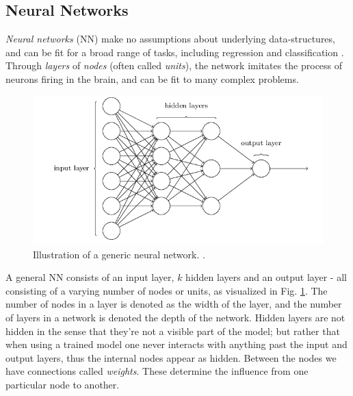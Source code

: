 \subsection{Neural Networks } 


\textit{Neural networks} (NN) make no assumptions about underlying data-structures, and can be fit for a broad range of tasks, including regression and classification \citep[Neural networks]{morten}. Through \textit{layers} of \textit{nodes} (often called \textit{units}), the network imitates the process of neurons firing in the brain, and can be fit to many complex problems.

\begin{figure}[H]
    \centering
    \includegraphics[width=1\linewidth]{project_2/figures/generic_NN.png}
    \caption{Illustration of a generic neural network. \cite[Taken from][Ch.1]{nielsen}.}
    \label{fig:NN}
\end{figure}

A general NN consists of an input layer, $k$ hidden layers and an output layer - all consisting of a varying number of nodes or units, as visualized in Fig. \ref{fig:NN}. The number of nodes in a layer is denoted as the width of the layer, and the number of layers in a network is denoted the depth of the network. 
Hidden layers are not hidden in the sense that they're not a visible part of the model; but rather that when using a trained model one never interacts with anything past the input and output layers, thus the internal nodes appear as hidden. 
Between the nodes we have connections called \textit{weights}. These determine the influence from one particular node to another. 

